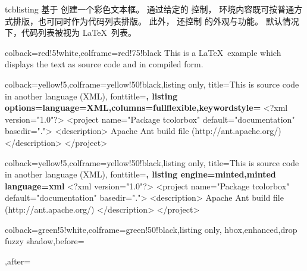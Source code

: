 \begin{docEnvironment}{tcblisting}{}
  基于  创建一个彩色文本框。
  通过给定的  控制，
  环境内容既可按普通方式排版，也可同时作为代码列表排版。
  此外， 还控制  的外观与功能。
  默认情况下，代码列表被视为 \LaTeX\ 列表。
\begin{dispExample}
\begin{tcblisting}{colback=red!5!white,colframe=red!75!black}
This is a \LaTeX\ example which displays the text as source code
and in compiled form.
\end{tcblisting}
\end{dispExample}

\clearpage

\begin{dispExample}
\begin{tcblisting}{colback=yellow!5,colframe=yellow!50!black,listing only,
    title=This is source code in another language (XML), fonttitle=\bfseries,
  listing options={language=XML,columns=fullflexible,keywordstyle=\color{red}}}
<?xml version="1.0"?>
<project name="Package tcolorbox" default="documentation" basedir=".">
  <description>
    Apache Ant build file (http://ant.apache.org/)
  </description>
</project>
\end{tcblisting}
\end{dispExample}

\enlargethispage*{10mm}

\begin{dispExample}
\begin{tcblisting}{colback=yellow!5,colframe=yellow!50!black,listing only,
    title=This is source code in another language (XML), fonttitle=\bfseries,
  listing engine=minted,minted language=xml}
<?xml version="1.0"?>
<project name="Package tcolorbox" default="documentation" basedir=".">
  <description>
    Apache Ant build file (http://ant.apache.org/)
  </description>
</project>
\end{tcblisting}
\end{dispExample}



\begin{dispExample}
\begin{tcblisting}{colback=green!5!white,colframe=green!50!black,listing only,
  hbox,enhanced,drop fuzzy shadow,before=\begin{center},after=\end{center}}
\end{tcblisting}
\end{dispExample}
\end{docEnvironment}


